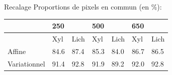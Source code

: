 \documentclass[10pt]{beamer}
\begin{document}
\begin{frame}{Recalage}
Proportions de pixels en commun (en \%):
\begin{table}[]
\begin{tabular}{lllllll}
\hline
                            & \multicolumn{2}{l}{250} & \multicolumn{2}{l}{500} & \multicolumn{2}{l}{650} \\ \hline
       & Xyl        & Lich       & Xyl        & Lich       & Xyl        & Lich       \\ \hline
Affine & 84.6      & 87.4      & 85.3      & 84.0      & 86.7      & 86.5      \\
Variationnel                 & 91.4      & 92.8      & 91.9      & 89.2      & 92.0      & 92.8      \\ \hline
\end{tabular}
\end{table}


\end{frame}
\end{document}
